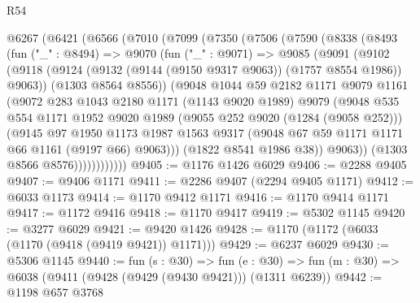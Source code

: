 \begin{lexlean}{R54}
\begin{coremodule}
  @6267
    (@6421
      (@6566
        (@7010
          (@7099
            (@7350
              (@7506
                (@7590
                  (@8338
                    (@8493
                      (fun ("_" : @8494) =>
                      @9070
                        (fun ("_" : @9071) =>
                        @9085
                          (@9091
                            (@9102
                              (@9118
                                (@9124
                                  (@9132 (@9144 (@9150 @9317 @9063)) (@1757 @8554 @1986))
                                  @9063))
                              (@1303 @8564 @8556))
                            (@9048
                              @1044
                              @59
                              @2182
                              @1171
                              @9079
                              @1161
                              (@9072
                                @283
                                @1043
                                @2180
                                @1171
                                (@1143 @9020 @1989)
                                @9079
                                (@9048
                                  @535
                                  @554
                                  @1171
                                  @1952
                                  @9020
                                  @1989
                                  (@9055 @252 @9020 (@1284 (@9058 @252)))
                                  (@9145
                                    @97
                                    @1950
                                    @1173
                                    @1987
                                    @1563
                                    @9317
                                    (@9048 @67 @59 @1171 @1171 @66 @1161 (@9197 @66) @9063)))
                                (@1822 @8541 @1986 @38))
                              @9063))
                          (@1303 @8566 @8576))))))))))))
@9405 := @1176 @1426 @6029
@9406 := @2288 @9405
@9407 := @9406 @1171
@9411 := @2286 @9407 (@2294 @9405 @1171)
@9412 := @6033 @1173
@9414 := @1170 @9412 @1171
@9416 := @1170 @9414 @1171
@9417 := @1172 @9416
@9418 := @1170 @9417
@9419 := @5302 @1145
@9420 := @3277 @6029
@9421 := @9420 @1426
@9428 := @1170 (@1172 (@6033 (@1170 (@9418 (@9419 @9421)) @1171)))
@9429 := @6237 @6029
@9430 := @5306 @1145
@9440 := fun (s : @30) =>
  fun (e : @30) => fun (m : @30) => @6038 (@9411 (@9428 (@9429 (@9430 @9421))) (@1311 @6239))
@9442 := @1198 @657 @3768

\end{coremodule}
\end{lexlean}
